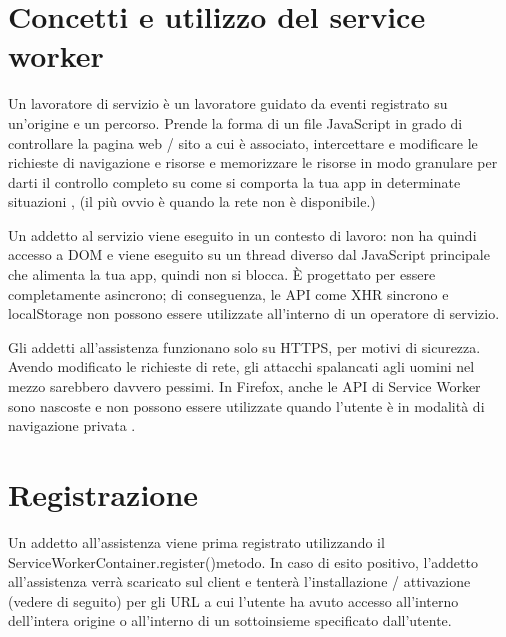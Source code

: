 \documentclass[italian]{article}
\begin{document}
\section{Concetti e utilizzo del service worker}
Un lavoratore di servizio è un lavoratore guidato da eventi registrato su un'origine e un percorso. Prende la forma di un file JavaScript in grado di controllare la pagina web / sito a cui è associato, intercettare e modificare le richieste di navigazione e risorse e memorizzare le risorse in modo granulare per darti il controllo completo su come si comporta la tua app in determinate situazioni , (il più ovvio è quando la rete non è disponibile.)

Un addetto al servizio viene eseguito in un contesto di lavoro: non ha quindi accesso a DOM e viene eseguito su un thread diverso dal JavaScript principale che alimenta la tua app, quindi non si blocca. È progettato per essere completamente asincrono; di conseguenza, le API come XHR sincrono e localStorage non possono essere utilizzate all'interno di un operatore di servizio.

Gli addetti all'assistenza funzionano solo su HTTPS, per motivi di sicurezza. Avendo modificato le richieste di rete, gli attacchi spalancati agli uomini nel mezzo sarebbero davvero pessimi. In Firefox, anche le API di Service Worker sono nascoste e non possono essere utilizzate quando l'utente è in modalità di navigazione privata .

\section{Registrazione}
Un addetto all'assistenza viene prima registrato utilizzando il ServiceWorkerContainer.register()metodo. In caso di esito positivo, l'addetto all'assistenza verrà scaricato sul client e tenterà l'installazione / attivazione (vedere di seguito) per gli URL a cui l'utente ha avuto accesso all'interno dell'intera origine o all'interno di un sottoinsieme specificato dall'utente.
\end{document}
